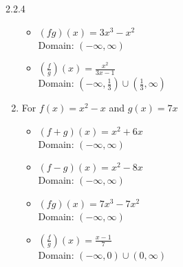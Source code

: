 \begin{Answer}{2.2.4}
\begin{enumerate}
\begin{multicols}{2}
			\begin{itemize}

				\item $(fg)(x) = 3x^3-x^2$ \\
				Domain: $(-\infty, \infty)$

				\vfill

				\columnbreak

				\item $\left(\frac{f}{g}\right)(x) = \frac{x^2}{3x-1}$ \\
				Domain:  $\left(-\infty, \frac{1}{3} \right) \cup \left(\frac{1}{3}, \infty \right)$


			\end{itemize}

		\end{multicols}

		\item For $f(x) = x^2-x$ and $g(x) = 7x$

		\begin{multicols}{2}

			\begin{itemize}

				\item $(f+g)(x) = x^2+6x$ \\
				Domain: $(-\infty, \infty)$

				\vfill

				\columnbreak

				\item $(f-g)(x) = x^2-8x$ \\
				Domain:  $(-\infty, \infty)$


			\end{itemize}

		\end{multicols}

		\begin{multicols}{2}

			\begin{itemize}

				\item $(fg)(x) = 7x^3-7x^2$ \\
				Domain: $(-\infty, \infty)$

				\vfill

				\columnbreak

				\item $\left(\frac{f}{g}\right)(x) = \frac{x-1}{7}$ \\
				Domain:  $\left(-\infty, 0 \right) \cup \left(0, \infty \right)$



\end{itemize}
\end{multicols}
\end{enumerate}
\end{Answer}
